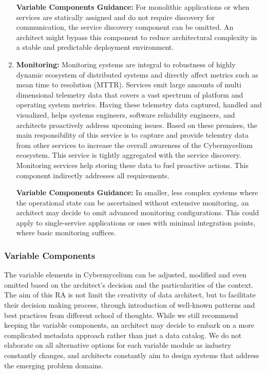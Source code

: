 \documentclass[review]{elsarticle}
\begin{document}
\begin{enumerate}
    \textbf{Variable Components Guidance:} For monolithic applications or when services are statically assigned and do not require discovery for communication, the service discovery component can be omitted. An architect might bypass this component to reduce architectural complexity in a stable and predictable deployment environment.

    \item \textbf{Monitoring:} Monitoring systems are integral to robustness of highly dynamic ecosystem of distributed systems and directly affect metrics such as mean time to resolution (MTTR). Services emit large amounts of multi dimensional telemetry data that covers a vast spectrum of platform and operating system metrics. Having these telemetry data captured, handled and visualized, helps systems engineers, software reliability engineers, and architects proactively address upcoming issues. Based on these premises, the main responsibility of this service is to capture and provide telemtry data from other services to increase the overall awareness of the Cybermycelium ecosystem. This service is tightly aggregated with the service discovery. Monitoring services help storing these data to fuel proactive actions. This component
    indirectly addresses all requirements.

    \textbf{Variable Components Guidance:} In smaller, less complex systems where the operational state can be ascertained without extensive monitoring, an architect may decide to omit advanced monitoring configurations. This could apply to single-service applications or ones with minimal integration points, where basic monitoring suffices.

\end{enumerate}

\subsubsection{Variable Components}

The variable elements in Cybermycelium can be adjusted, modified and even omitted based on the architect's decision and the particularities of the context. The aim of this RA is not limit the creativity of data architect, but to facilitate their decision making process, through introduction of well-known patterns and best practices from different school of thoughts. While we still recommend keeping the variable components, an architect may decide to embark on a more complicated metadata approach rather than just a data catalog. We do not elaborate on all alternative options for each variable module as industry constantly changes, and architects constantly aim to design systems that address the emerging problem domains. 
\end{document}
